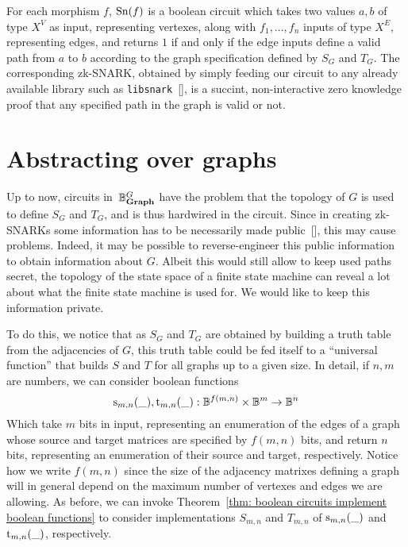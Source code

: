 \documentclass[submission,copyright,creativecommons,sharealike,noncommercial]{eptcs}
\begin{document}
For each morphism $f$, $\operatorname{Sn}(f)$ is a boolean circuit which takes 
two values $a,b$ of type $X^V$ as input, representing vertexes, 
along with $f_1, \dots, f_n$ inputs of type $X^E$, representing 
edges, and returns $1$ if and only if the edge inputs define a valid path 
from $a$ to $b$ according to the graph specification defined by $S_G$ and $T_G$.
The corresponding zk-SNARK, obtained by simply feeding our circuit to 
any already available library such as \texttt{libsnark}~[], is a succint,
non-interactive zero knowledge proof that any specified 
path in the graph is valid or not.
%
%
%
\section{Abstracting over graphs}\label{sec: abstracting over graphs}
%
%
Up to now, circuits in~$\mathbb{B}^{G}_{\textbf{Graph}}$ have the problem that 
the topology of $G$ is used to define $S_G$ and $T_G$, and is thus 
hardwired in the circuit. Since in creating zk-SNARKs some 
information has to be necessarily made public~[], this may cause 
problems. Indeed, it may be possible to reverse-engineer this 
public information to obtain information about $G$. Albeit 
this would still allow to keep used paths secret, the topology 
of the state space of a finite state machine can reveal a lot about 
what the finite state machine is used for. We would like to keep this 
information private.

To do this, we notice that as $S_G$ and $T_G$ are obtained by building 
a truth table from the adjacencies of $G$, this truth 
table could be fed itself to a ``universal function'' that builds $S$ and $T$
for all graphs up to a given size. In detail, if $n, m$ are numbers, 
we can consider boolean functions
%
%
\begin{equation*}
  \operatorname{s}_{m,n}(\_), \operatorname{t}_{m,n}(\_): \mathbb{B}^{f(m,n)} \times \mathbb{B}^m \to \mathbb{B}^n 
\end{equation*}
%
Which take $m$ bits in input, representing an enumeration of 
the edges of a graph whose source and target matrices are 
specified by $f(m,n)$ bits, and return $n$ bits, representing
an enumeration of their source and target, respectively. Notice how we 
write $f(m,n)$ since the size of the adjacency matrixes defining 
a graph will in general depend on the maximum number of 
vertexes and edges we are allowing. As before, we can 
invoke Theorem~\ref{thm: boolean circuits implement boolean 
functions} to consider implementations $S_{m,n}$ 
and $T_{m,n}$ of $\operatorname{s}_{m,n}(\_)$ and $\operatorname{t}_{m,n}(\_)$, 
respectively.
\end{document}

